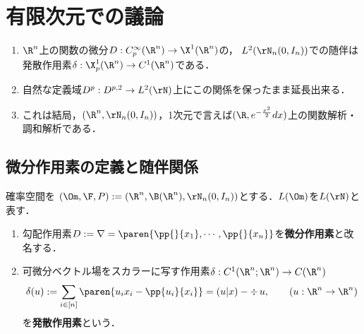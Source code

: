 \documentclass[uplatex,dvipdfmx]{jsreport}
\begin{document}
\section{有限次元での議論}

\begin{tcolorbox}[colframe=ForestGreen, colback=ForestGreen!10!white,breakable,colbacktitle=ForestGreen!40!white,coltitle=black,fonttitle=\bfseries\sffamily,
title=]
    \begin{enumerate}
        \item $\R^n$上の関数の微分$D:C^\infty_p(\R^n)\to\X^1(\R^n)$の，
        $L^2(\rN_n(0,I_n))$での随伴は
        発散作用素$\delta:\X^1_p(\R^n)\to C^1(\R^n)$である．
        \item 自然な定義域$D^p:D^{p,2}\to L^2(\rN)$上にこの関係を保ったまま延長出来る．
        \item これは結局，$(\R^n,\rN_n(0,I_n))$，1次元で言えば$(\R,e^{-\frac{x^2}{2}}dx)$上の関数解析・調和解析である．
    \end{enumerate}
\end{tcolorbox}

\subsection{微分作用素の定義と随伴関係}

\begin{definition}
    確率空間を
    $(\Om,\F,P):=(\R^n,\B(\R^n),\rN_n(0,I_n))$とする．$L(\Om)$を$L(\rN)$と表す．
    \begin{enumerate}
        \item 勾配作用素$D:=\nabla=\paren{\pp{}{x_1},\cdots,\pp{}{x_n}}$を\textbf{微分作用素}と改名する．
        \item 可微分ベクトル場をスカラーに写す作用素$\delta:C^1(\R^n;\R^n)\to C(\R^n)$
        \[\delta(u):=\sum_{i\in[n]}\paren{u_ix_i-\pp{u_i}{x_i}}=(u|x)-\div\, u,\qquad (u:\R^n\to\R^n)\]
        を\textbf{発散作用素}という．
    \end{enumerate}
\end{definition}
\end{document}
